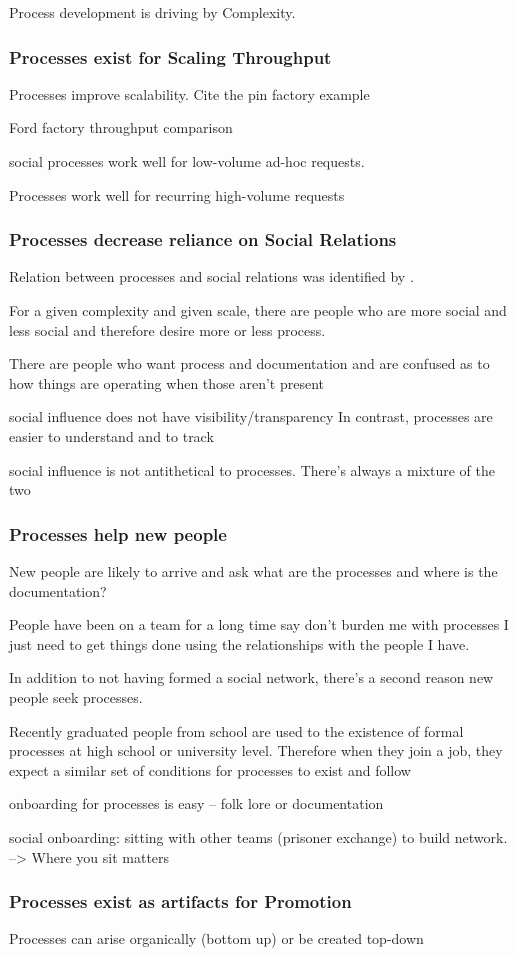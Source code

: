 Process development is driving by Complexity.

\subsubsection{Processes exist for Scaling Throughput}

Processes improve scalability. Cite the pin factory example

Ford factory throughput comparison

social processes work well for low-volume ad-hoc requests.

Processes work well for recurring high-volume requests

\subsubsection{Processes decrease reliance on Social Relations}

Relation between processes and social relations was identified by \cite{1943_Selznick}.

For a given complexity and given scale, there are people who are more social and less social and therefore desire more or less process.

There are people who want process and documentation and are confused as to how things are operating when those aren't present


social influence does not have visibility/transparency
In contrast, processes are easier to understand and to track

social influence is not antithetical to processes. There's always a mixture of the two


\subsubsection{Processes help new people}

New people are likely to arrive and ask what are the processes and where is the documentation?

People have been on a team for a long time say don't burden me with processes I just need to get things done using the relationships with the people I have.

In addition to not having formed a social network, there's a second reason new people seek processes.

Recently graduated people from school are used to the existence of formal processes at high school or university level. Therefore when they join a job, they expect a similar set of conditions for processes to exist and follow

onboarding for processes is easy -- folk lore or documentation

social onboarding: sitting with other teams (prisoner exchange) to build network.
--> Where you sit matters

\subsubsection{Processes exist as artifacts for Promotion}

Processes can arise organically (bottom up) or be created top-down

